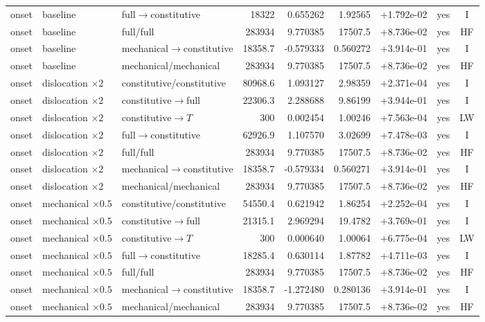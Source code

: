 \begin{landscape}
\begin{longtable}{@{}p{1.15cm}p{2.55cm}p{3.60cm}rrrrcc@{}}
onset & baseline & full$\rightarrow$constitutive & 18322 & 0.655262 & 1.92565 & +1.792e-02 & yes & I \\
onset & baseline & full/full & 283934 & 9.770385 & 17507.5 & +8.736e-02 & yes & HF \\
onset & baseline & mechanical$\rightarrow$constitutive & 18358.7 & -0.579333 & 0.560272 & +3.914e-01 & yes & I \\
onset & baseline & mechanical/mechanical & 283934 & 9.770385 & 17507.5 & +8.736e-02 & yes & HF \\
onset & dislocation $\times2$ & constitutive/constitutive & 80968.6 & 1.093127 & 2.98359 & +2.371e-04 & yes & I \\
onset & dislocation $\times2$ & constitutive$\rightarrow$full & 22306.3 & 2.288688 & 9.86199 & +3.944e-01 & yes & I \\
onset & dislocation $\times2$ & constitutive$\rightarrow T$ & 300 & 0.002454 & 1.00246 & +7.563e-04 & yes & LW \\
onset & dislocation $\times2$ & full$\rightarrow$constitutive & 62926.9 & 1.107570 & 3.02699 & +7.478e-03 & yes & I \\
onset & dislocation $\times2$ & full/full & 283934 & 9.770385 & 17507.5 & +8.736e-02 & yes & HF \\
onset & dislocation $\times2$ & mechanical$\rightarrow$constitutive & 18358.7 & -0.579334 & 0.560271 & +3.914e-01 & yes & I \\
onset & dislocation $\times2$ & mechanical/mechanical & 283934 & 9.770385 & 17507.5 & +8.736e-02 & yes & HF \\
onset & mechanical $\times0.5$ & constitutive/constitutive & 54550.4 & 0.621942 & 1.86254 & +2.252e-04 & yes & I \\
onset & mechanical $\times0.5$ & constitutive$\rightarrow$full & 21315.1 & 2.969294 & 19.4782 & +3.769e-01 & yes & I \\
onset & mechanical $\times0.5$ & constitutive$\rightarrow T$ & 300 & 0.000640 & 1.00064 & +6.775e-04 & yes & LW \\
onset & mechanical $\times0.5$ & full$\rightarrow$constitutive & 18285.4 & 0.630114 & 1.87782 & +4.711e-03 & yes & I \\
onset & mechanical $\times0.5$ & full/full & 283934 & 9.770385 & 17507.5 & +8.736e-02 & yes & HF \\
onset & mechanical $\times0.5$ & mechanical$\rightarrow$constitutive & 18358.7 & -1.272480 & 0.280136 & +3.914e-01 & yes & I \\
onset & mechanical $\times0.5$ & mechanical/mechanical & 283934 & 9.770385 & 17507.5 & +8.736e-02 & yes & HF \\

\end{longtable}
\end{landscape}
